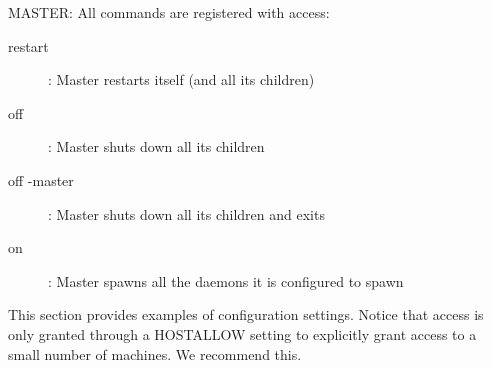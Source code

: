 MASTER:  All commands are registered with 
access:

\begin{description}
\item[restart] : Master restarts itself (and all its children)	
\item[off] : Master shuts down all its children
\item[off -master] : Master shuts down all its children and exits
\item[on] : Master spawns all the daemons it is configured to spawn
\end{description}


This section provides examples of configuration settings.
Notice that  access is
only granted through a HOSTALLOW setting to explicitly grant access to
a small number of machines.  We recommend this.

